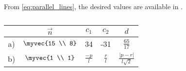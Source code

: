 	From \eqref{eq:parallel_lines}, the desired values are available in
  .
\begin{table}[H]
  \centering
  \begin{tabular}{|c|c|c|c|c|}
    \hline
    & $\vec{n}$ & $c_1$ & $c_2$ & $d$ \\
    \hline
    a) & $\myvec{15 \\ 8}$ & 34 & -31 & $\frac{65}{17}$ \\
    \hline
    b) & $\myvec{1 \\ 1}$ & $\frac{-p}{l}$ & $\frac{r}{l}$ & $\frac{\lvert p-r \rvert}{l\sqrt{2}}$ \\
    \hline
  \end{tabular}
  \caption{}
  \label{tab:11/10/3/6}
\end{table}
